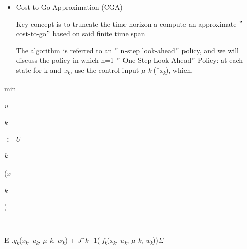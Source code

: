 \documentclass[12pt,twoside]{article}
\begin{document}
\begin{itemize}
\begin{itemize}
\begin{adjustwidth}{0.43in}{0.54in}
\end{adjustwidth}


\vspace{\baselineskip}

\vspace{\baselineskip}
	\item Cost to Go Approximation (CGA)\par


\vspace{\baselineskip}
{\fontsize{10pt}{12.0pt}\selectfont Key concept is to truncate the time horizon a compute an approximate $"$ cost-to-go$"$  based on said finite time span\par}\par

The algorithm is referred to an $"$ n-step look-ahead$"$  policy, and we will discuss the policy in which n=1 $"$ One-Step Look-Ahead$"$  Policy: at each state for k and \textit{x\textsubscript{k}}, use the control input \textit{$ \mu $ k }(¯\textit{x\textsubscript{k}}), which,\par


\vspace{\baselineskip}

\end{itemize}
\end{itemize}{\fontsize{10pt}{12.0pt}\selectfont min\par}\par

\begin{FlushRight}
{\fontsize{7pt}{8.4pt}\selectfont \textit{u}{\fontsize{6pt}{7.2pt}\selectfont \textit{k }{\fontsize{7pt}{8.4pt}\selectfont $ \in $ \textit{U}{\fontsize{6pt}{7.2pt}\selectfont \textit{k }{\fontsize{7pt}{8.4pt}\selectfont (\textit{x}{\fontsize{6pt}{7.2pt}\selectfont \textit{k }{\fontsize{7pt}{8.4pt}\selectfont )\par}\par}\par}\par}\par}\par}\par}
\end{FlushRight}\par

\begin{FlushLeft}
\\
{\fontsize{10pt}{12.0pt}\selectfont E .\textit{g\textsubscript{k}}(\textit{x\textsubscript{k}}, \textit{u\textsubscript{k}}, \textit{$ \mu $ k}, \textit{w\textsubscript{k}}) + \textit{J}˜\textit{k}+1( \textit{f\textsubscript{k}}(\textit{x\textsubscript{k}}, \textit{u\textsubscript{k}}, \textit{$ \mu $ k}, \textit{w\textsubscript{k}}))$  \Sigma  $ \par}
\end{FlushLeft}\par
\end{document}
